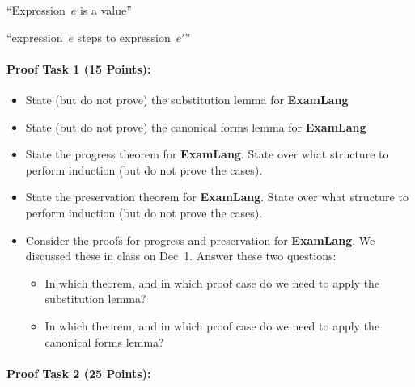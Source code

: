 \documentclass{article}
\newcommand{\stepsto}{\longrightarrow}
\begin{document}
``Expression~$e$ is a value''

\fbox{$e \stepsto e'$} 
``expression~$e$ steps to expression~$e'$''

\paragraph{Proof Task 1 (15 Points):}

\begin{itemize}
\item State (but do not prove) the substitution lemma for \textbf{ExamLang}
\item State (but do not prove) the canonical forms lemma for \textbf{ExamLang}
\item State the progress theorem for \textbf{ExamLang}. 
State over what structure to perform induction (but do not prove the cases).
\item State the preservation theorem for \textbf{ExamLang}.
State over what structure to perform induction (but do not prove the cases).
\item Consider the proofs for progress and preservation for \textbf{ExamLang}.  
We discussed these in class on Dec~1.  Answer these two questions:
\begin{itemize}
\item In which theorem, and in which proof case do we need to apply the substitution lemma?
\item In which theorem, and in which proof case do we need to apply the canonical forms lemma?
\end{itemize}
\end{itemize}

\paragraph{Proof Task 2 (25 Points):}
\end{document}

